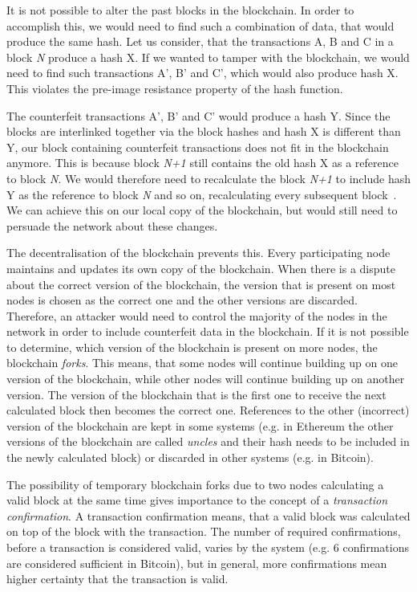 It is not possible to alter the past blocks in the blockchain. In order to accomplish this, we would need to find such a combination of data, that would produce the same hash. Let us consider, that the transactions A, B and C in a block \textit{N} produce a hash X. If we wanted to tamper with the blockchain, we would need to find such transactions A', B' and C', which would also produce hash X. This violates the pre-image resistance property of the hash function.

The counterfeit transactions A', B' and C' would produce a hash Y. Since the blocks are interlinked together via the block hashes and hash X is different than Y, our block containing counterfeit transactions does not fit in the blockchain anymore. This is because block \textit{N+1} still contains the old hash X as a reference to block \textit{N}. We would therefore need to recalculate the block \textit{N+1} to include hash Y as the reference to block \textit{N} and so on, recalculating every subsequent block~\cite[3]{NakamotoBitcoin:System}. We can achieve this on our local copy of the blockchain, but would still need to persuade the network about these changes.

The decentralisation of the blockchain prevents this. Every participating node maintains and updates its own copy of the blockchain. When there is a dispute about the correct version of the blockchain, the version that is present on most nodes is chosen as the correct one and the other versions are discarded. Therefore, an attacker would need to control the majority of the nodes in the network in order to include counterfeit data in the blockchain. If it is not possible to determine, which version of the blockchain is present on more nodes, the blockchain \textit{forks}. This means, that some nodes will continue building up on one version of the blockchain, while other nodes will continue building up on another version. The version of the blockchain that is the first one to receive the next calculated block then becomes the correct one. References to the other (incorrect) version of the blockchain are kept in some systems (e.g. in Ethereum the other versions of the blockchain are called \textit{uncles} and their hash needs to be included in the newly calculated block) or discarded in other systems (e.g. in Bitcoin).

The possibility of temporary blockchain forks due to two nodes calculating a valid block at the same time gives importance to the concept of a \textit{transaction confirmation}. A transaction confirmation means, that a valid block was calculated on top of the block with the transaction. The number of required confirmations, before a transaction is considered valid, varies by the system (e.g. 6 confirmations are considered sufficient in Bitcoin), but in general, more confirmations mean higher certainty that the transaction is valid\footnotemark.
% 

